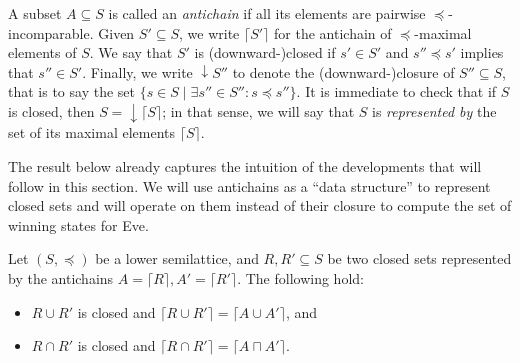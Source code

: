\documentclass[runningheads,a4paper,draft]{llncs}
\newcommand{\eve}{Eve\xspace}
\newcommand{\closedn}[1]{\mathrm{\downarrow} #1}
\begin{document}
A subset $A \subseteq S$ is called an \emph{antichain} if all its elements are
pairwise $\preceq$-incomparable.  Given $S' \subseteq S$, we write $\lceil S'
\rceil$ for the antichain of $\preceq$-maximal elements of $S$. We say that
$S'$ is (downward-)closed if $s' \in S'$ and $s'' \preceq s'$ implies that $s''
\in S'$. Finally, we write $\closedn{S''}$ to denote the (downward-)closure of
$S'' \subseteq S$, that is to say the set $\{s \in S \mid \exists s'' \in S''
: s \preceq s''\}$.  It is immediate to check that if \(S\) is closed, then
\(S = \closedn{\lceil S \rceil}\); in that sense, we will say that \(S\) is
\emph{represented by} the set of its maximal elements \(\lceil S \rceil\).

The result below already captures the intuition of the developments that will
follow in this section. We will use antichains as a ``data structure'' to
represent closed sets and will operate on them instead of their closure to
compute the set of winning states for \eve.
\begin{proposition}\label{pro:antichains}
  Let $(S, \preceq)$ be a lower semilattice, and $R,R' \subseteq S$ be two
  closed sets represented by the antichains $A = \lceil R \rceil, A' =
  \lceil R' \rceil$. The following hold:
  \begin{itemize}
    \item $R \cup R'$ is closed and $\lceil R \cup R' \rceil = \lceil A
      \cup A'\rceil$, and
    \item $R \cap R'$ is closed and $\lceil R \cap R' \rceil = \lceil A
      \sqcap A'\rceil$.
  \end{itemize}
\end{proposition}
\end{document}
